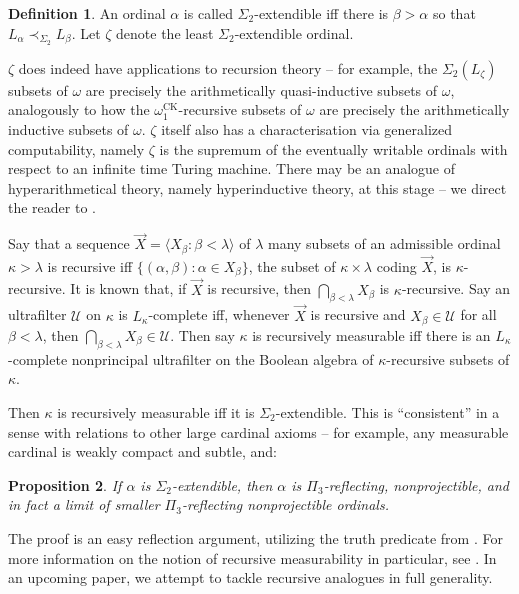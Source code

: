 \documentclass{article}
\theoremstyle{definition}
\newtheorem{definition}{Definition}[section]
\theoremstyle{plain}
\theoremstyle{plain}
\theoremstyle{plain}
\newtheorem{proposition}[definition]{Proposition}
\theoremstyle{plain}
\theoremstyle{remark}
\theoremstyle{remark}
\theoremstyle{remark}
\theoremstyle{plain}
\theoremstyle{plain}
\theoremstyle{plain}
\begin{document}
\begin{definition}
\label{Extendible}
An ordinal $\alpha$ is called $\Sigma_2$-extendible iff there is $\beta > \alpha$ so that $L_\alpha \prec_{\Sigma_2} L_\beta$. Let $\zeta$ denote the least $\Sigma_2$-extendible ordinal.
\end{definition}

$\zeta$ does indeed have applications to recursion theory -- for example, the $\Sigma_2(L_\zeta)$ subsets of $\omega$ are precisely the arithmetically quasi-inductive subsets of $\omega$, analogously to how the $\omega_1^{\mathrm{CK}}$-recursive subsets of $\omega$ are precisely the arithmetically inductive subsets of $\omega$. $\zeta$ itself also has a characterisation via generalized computability, namely $\zeta$ is the supremum of the eventually writable ordinals with respect to an infinite time Turing machine. There may be an analogue of hyperarithmetical theory, namely hyperinductive theory, at this stage -- we direct the reader to \cite{klev}.

Say that a sequence $\vec{X} = \langle X_\beta: \beta < \lambda \rangle$ of $\lambda$ many subsets of an admissible ordinal $\kappa > \lambda$ is recursive iff $\{(\alpha, \beta): \alpha \in X_\beta\}$, the subset of $\kappa \times \lambda$ coding $\vec{X}$, is $\kappa$-recursive. It is known that, if $\vec{X}$ is recursive, then $\bigcap_{\beta < \lambda} X_\beta$ is $\kappa$-recursive. Say an ultrafilter $\mathcal{U}$ on $\kappa$ is $L_\kappa$-complete iff, whenever $\vec{X}$ is recursive and $X_\beta \in \mathcal{U}$ for all $\beta < \lambda$, then $\bigcap_{\beta < \lambda} X_\beta \in \mathcal{U}$. Then say $\kappa$ is recursively measurable iff there is an $L_\kappa$-complete nonprincipal ultrafilter on the Boolean algebra of $\kappa$-recursive subsets of $\kappa$.

Then $\kappa$ is recursively measurable iff it is $\Sigma_2$-extendible. This is ``consistent'' in a sense with relations to other large cardinal axioms -- for example, any measurable cardinal is weakly compact and subtle, and:

\begin{proposition}
\label{ExtendibleRefAndNpr}
If $\alpha$ is $\Sigma_2$-extendible, then $\alpha$ is $\Pi_3$-reflecting, nonprojectible, and in fact a limit of smaller $\Pi_3$-reflecting nonprojectible ordinals.
\end{proposition}

The proof is an easy reflection argument, utilizing the truth predicate from \cite{levy}. For more information on the notion of recursive measurability in particular, see \cite{kaufmann}. In an upcoming paper, we attempt to tackle recursive analogues in full generality.

\printbibliography[heading=bibintoc,title={References}]
\end{document}
